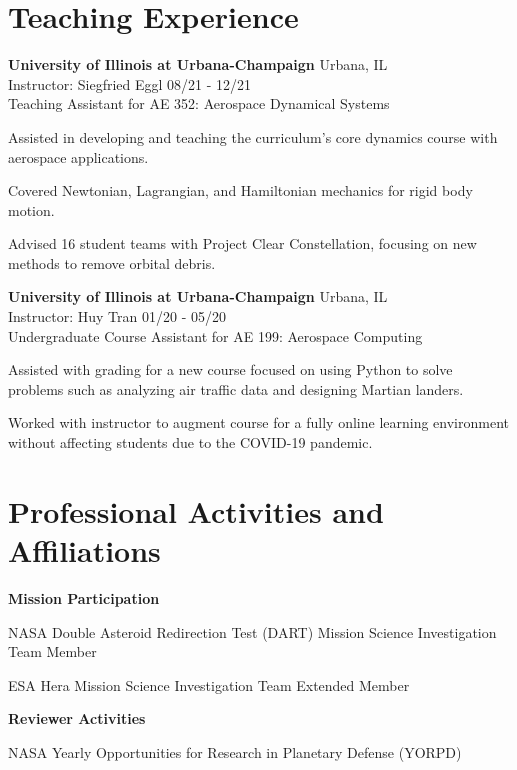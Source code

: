 \documentclass[margin,line]{res}
\newlength{\myitemspacing}
\newenvironment{list_new}{
    \begin{list}{\scriptsize{$\bullet$}}{%
        \setlength{\itemsep}{0in}
        \setlength{\parsep}{\myitemspacing} \setlength{\parskip}{0in}
        \setlength{\topsep}{0in} \setlength{\partopsep}{0in} 
        \setlength{\leftmargin}{0.2in}
        }}
    {\end{list}
}
\begin{document}
\begin{resume}
\section{\sc Teaching Experience}
{\bf University of Illinois at Urbana-Champaign} \hfill Urbana, IL\\
Instructor: Siegfried Eggl \hfill 08/21 - 12/21\\
Teaching Assistant for AE 352: Aerospace Dynamical Systems
\begin{list_new}
    \item Assisted in developing and teaching the curriculum's core dynamics course with aerospace applications.
    \item Covered Newtonian, Lagrangian, and Hamiltonian mechanics for rigid body motion.
    \item Advised 16 student teams with Project Clear Constellation, focusing on new methods to remove orbital debris.
\end{list_new}
{\bf University of Illinois at Urbana-Champaign} \hfill Urbana, IL\\
Instructor: Huy Tran \hfill 01/20 - 05/20\\
Undergraduate Course Assistant for AE 199: Aerospace Computing
\begin{list_new}
    \item Assisted with grading for a new course focused on using Python to solve problems such as analyzing air traffic data and designing Martian landers.
    \item Worked with instructor to augment course for a fully online learning environment without affecting students due to the COVID-19 pandemic.
\end{list_new}

\section{\sc Professional Activities and Affiliations}
{\bf Mission Participation}
\begin{list_new}
    \item NASA Double Asteroid Redirection Test (DART) Mission Science Investigation Team Member
    \item ESA Hera Mission Science Investigation Team Extended Member
\end{list_new}

{\bf Reviewer Activities}
\begin{list_new}
    \item NASA Yearly Opportunities for Research in Planetary Defense (YORPD)
\end{list_new}


\end{resume}
\end{document}

